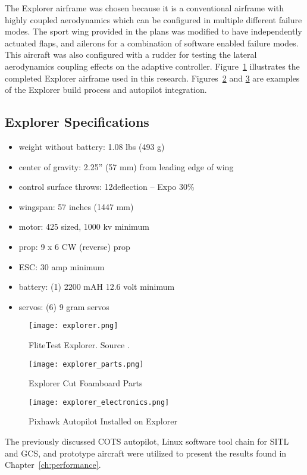 The Explorer airframe was chosen because it is a conventional airframe with highly coupled aerodynamics which can be configured in multiple different failure modes.  The sport wing provided in the plans was modified to have independently actuated flaps, and ailerons for a combination of software enabled failure modes.  This aircraft was also configured with a rudder for testing the lateral aerodynamics coupling effects on the adaptive controller.  Figure~\ref{fig:explorer} illustrates the completed Explorer airframe used in this research.  Figures~\ref{fig:explorer_parts} and \ref{fig:explorer_electronics} are examples of the Explorer build process and autopilot integration.

\subsection{Explorer Specifications}
\begin{itemize}
 \item weight without battery: 1.08 lbs (493 g)
 \item center of gravity: 2.25” (57 mm) from leading edge of wing
 \item control surface throws: 12\degrees  deflection – Expo 30\%
 \item wingspan: 57 inches (1447 mm)
 \item motor: 425 sized, 1000 kv minimum
 \item prop: 9 x 6 CW (reverse) prop
 \item ESC: 30 amp minimum
 \item battery: (1) 2200 mAH 12.6 volt minimum
 \item servos: (6) 9 gram servos 
\end{itemize}

\begin{figure}[!h]
 \centering
  \texttt{[image: explorer.png]}
  \caption{FliteTest Explorer.  Source \cite{flitetest}.}
  \label{fig:explorer}
\end{figure}

\begin{figure}[!h]
 \centering
  \texttt{[image: explorer\_parts.png]}
  \caption{Explorer Cut Foamboard Parts}
  \label{fig:explorer_parts}
\end{figure}

\begin{figure}[!h]
 \centering
  \texttt{[image: explorer\_electronics.png]}
  \caption{Pixhawk Autopilot Installed on Explorer}
  \label{fig:explorer_electronics}
\end{figure}

The previously discussed \ac{COTS} autopilot, Linux software tool chain for \ac{SITL} and \ac{GCS}, and prototype aircraft were utilized to present the results found in Chapter~\ref{ch:performance}.



